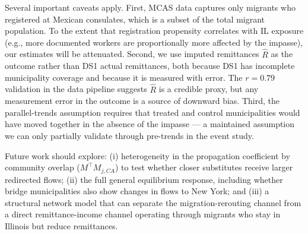 \documentclass[
  11pt,
  letterpaper,
  DIV=11,
  numbers=noendperiod]{scrartcl}
\begin{document}
Several important caveats apply. First, MCAS data captures only migrants
who registered at Mexican consulates, which is a subset of the total
migrant population. To the extent that registration propensity
correlates with IL exposure (e.g., more documented workers are
proportionally more affected by the impasse), our estimates will be
attenuated. Second, we use imputed remittances \(\hat{R}\) as the
outcome rather than DS1 actual remittances, both because DS1 has
incomplete municipality coverage and because it is measured with error.
The \(r = 0.79\) validation in the data pipeline suggests \(\hat{R}\) is
a credible proxy, but any measurement error in the outcome is a source
of downward bias. Third, the parallel-trends assumption requires that
treated and control municipalities would have moved together in the
absence of the impasse --- a maintained assumption we can only partially
validate through pre-trends in the event study.

Future work should explore: (i) heterogeneity in the propagation
coefficient by community overlap (\(M^\top M_{j,CA}\)) to test whether
closer substitutes receive larger redirected flows; (ii) the full
general equilibrium response, including whether bridge municipalities
also show changes in flows to New York; and (iii) a structural network
model that can separate the migration-rerouting channel from a direct
remittance-income channel operating through migrants who stay in
Illinois but reduce remittances.
\end{document}
